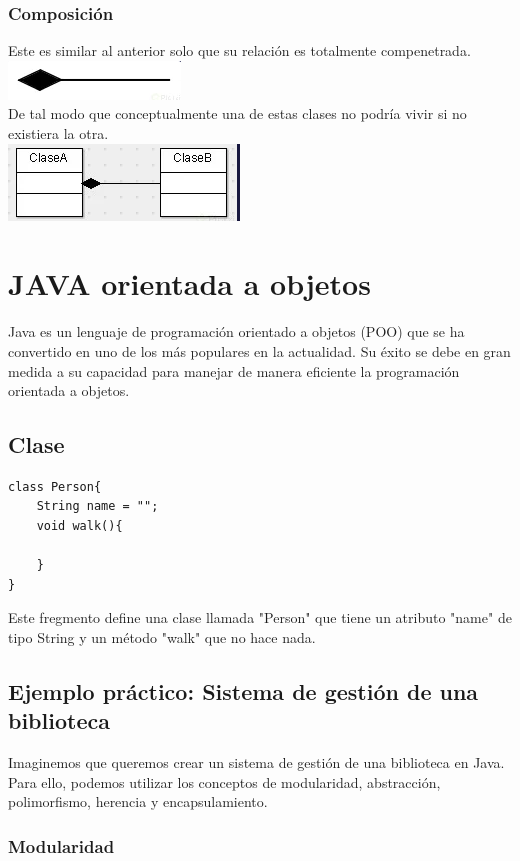 \documentclass[executivepaper]{article}
\begin{document}
\subsubsection*{Composición}
Este es similar al anterior solo que su relación es totalmente compenetrada.\\
\includegraphics[scale=0.5]{2.8.png}\\
De tal modo que conceptualmente una de estas clases no podría vivir si no existiera la otra.\\
\includegraphics[scale=0.5]{2.9.png}\\

\newpage
\section{JAVA orientada a objetos}
Java es un lenguaje de programación orientado a objetos (POO) que se ha convertido en uno de los más populares en la actualidad. Su éxito se debe en gran medida a su capacidad para manejar de manera eficiente la programación orientada a objetos. 
\subsection{Clase}
\begin{lstlisting}
class Person{
    String name = "";
    void walk(){

    }
} 
\end{lstlisting}
Este fregmento define una clase llamada "Person" que tiene un atributo "name" de tipo String y un método "walk" que no hace nada.

\subsection{Ejemplo práctico: Sistema de gestión de una biblioteca}

Imaginemos que queremos crear un sistema de gestión de una biblioteca en Java. Para ello, podemos utilizar los conceptos de modularidad, abstracción, polimorfismo, herencia y encapsulamiento.

\subsubsection*{Modularidad}
\end{document}

